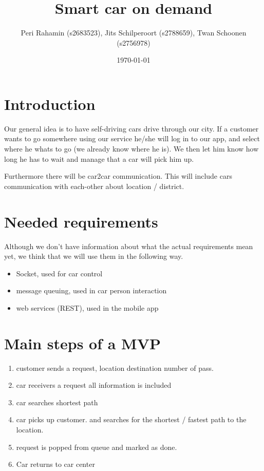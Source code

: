 \documentclass[8pt]{article}
\title{Smart car on demand}
\author{Peri Rahamin (s2683523),
  Jits Schilperoort (s2788659),
  Twan Schoonen (s2756978)}
\date{\today}
\begin{document}
\maketitle

\section{Introduction}

Our general idea is to have self-driving cars drive through our city.
If a customer wants to go somewhere using our service he/she will log in to our app, and select where he whats to go (we already know where he is).
We then let him know how long he has to wait and manage that a car will pick him up.

Furthermore there will be car2car communication. This will include cars communication with each-other about location / district.

\section{Needed requirements}
Although we don't have information about what the actual requirements mean yet, we think that we will use them in the following way.
\begin{itemize}[nolistsep]
\item Socket, used for car control
\item message queuing, used in car \- person interaction
\item web services (REST), used in the mobile app
\end{itemize}

\section{Main steps of a MVP}

\begin{enumerate}[nolistsep]
\item customer sends a request, location destination number of pass.
  
\item car receivers a request all information is included
  
\item car searches shortest path

\item car picks up customer. and searches for the shortest / fastest path to the location.

\item request is popped from queue and marked as done.

\item Car returns to car center

\end{enumerate}
\end{document}
